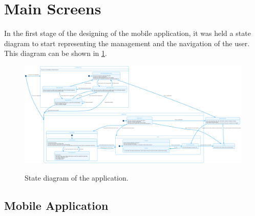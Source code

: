 \documentclass[./main.tex]{subfiles}
\begin{document}
\section{Main Screens} \label{sec:views}
In the first stage of the designing of the mobile application, it was held a state diagram to start representing the management and the navigation of the user. This diagram can be shown in \ref{fig:stateapp}.
\begin{figure}
	\centering
	\includegraphics[width=14cm]{stateapp.png}
	\label{fig:stateapp}
	\caption{State diagram of the application.}
\end{figure}
\subsection{Mobile Application}
\end{document}
